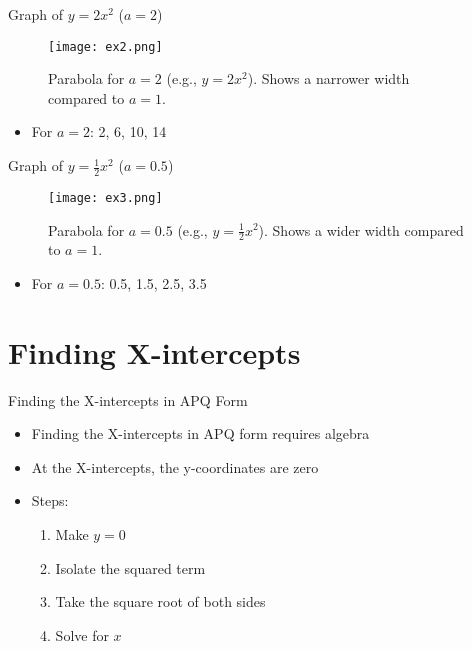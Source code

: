 \documentclass[aspectratio=169]{beamer}
\begin{document}
\begin{frame}{Graph of $y = 2x^2$ ($a=2$)}
    \begin{figure}[H]
        \centering
        \texttt{[image: ex2.png]}
        \caption{Parabola for $a=2$ (e.g., $y=2x^2$). Shows a narrower width compared to $a=1$.}
    \end{figure}
    \begin{tcolorbox}[colback=lightgray,colframe=primary,title=Congruency Pattern]
        \footnotesize
        \begin{itemize}
            \item For $a=2$: 2, 6, 10, 14
        \end{itemize}
    \end{tcolorbox}
\end{frame}

\begin{frame}{Graph of $y = \frac{1}{2}x^2$ ($a=0.5$)}
    \begin{figure}[H]
        \centering
        \texttt{[image: ex3.png]}
        \caption{Parabola for $a=0.5$ (e.g., $y=\frac{1}{2}x^2$). Shows a wider width compared to $a=1$.}
    \end{figure}
    \begin{tcolorbox}[colback=lightgray,colframe=primary,title=Congruency Pattern]
        \footnotesize
        \begin{itemize}
            \item For $a=0.5$: 0.5, 1.5, 2.5, 3.5
        \end{itemize}
    \end{tcolorbox}
\end{frame}

\section{Finding X-intercepts}

\begin{frame}{Finding the X-intercepts in APQ Form}
    \begin{tcolorbox}[colback=lightgray,colframe=primary,title=Method]
        \footnotesize
        \begin{itemize}
            \item Finding the X-intercepts in APQ form requires algebra
            \item At the X-intercepts, the y-coordinates are zero
            \item Steps:
                \begin{enumerate}
                    \item Make $y=0$
                    \item Isolate the squared term
                    \item Take the square root of both sides
                    \item Solve for $x$
                \end{enumerate}
        \end{itemize}
    \end{tcolorbox}
\end{frame}
\end{document}
